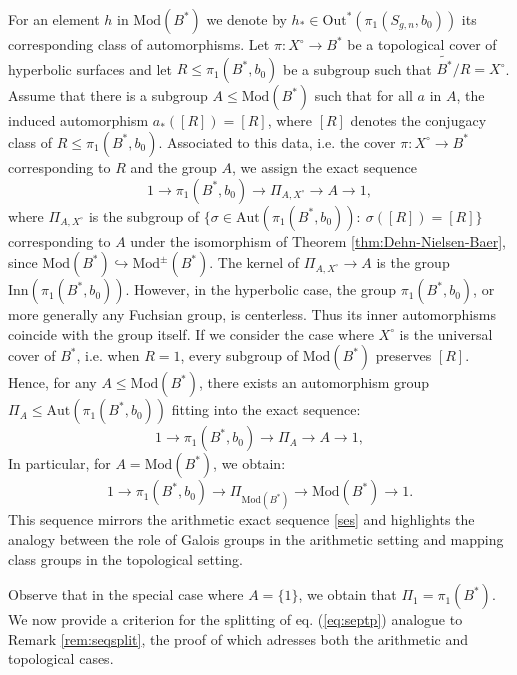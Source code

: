 \documentclass[10pt]{amsart}
\theoremstyle{definition}
\newcommand{\A}{{ \mathrm{Aut} }}
\begin{document}
For an element $h$ in $\mathrm{Mod}(B^*)$ we denote by $h_* \in \mathrm{Out}^*(\pi_1(S_{g,n},b_0)) $ its corresponding class of automorphisms. Let $\pi \colon X^\circ \rightarrow B^*$ be a topological cover of hyperbolic surfaces and let $R\leq \pi_1(B^*,b_0)$ be a subgroup such that $\widetilde{B^*}/R = X^\circ$. 
Assume that there is a subgroup $A \leq \mathrm{Mod}(B^*)$ such that for all $a$ in $A$, the induced automorphism $a_*([R]) = [R]$, where $[R]$ denotes the conjugacy class of $R \leq \pi_1(B^*,b_0)$. Associated to this data, i.e. the cover $\pi\colon X^\circ \rightarrow B^*$ corresponding to $R$ and the group $A$, we assign the exact sequence
\begin{equation}
    1\rightarrow \pi_1(B^*,b_0) \rightarrow \Pi_{A,X^\circ} \rightarrow A \rightarrow 1,
\end{equation}
where $\Pi_{A,X^\circ}$ is the subgroup of $\{ \sigma \in \A(\pi_1(B^*,b_0))\colon \ \sigma([R]) = [R] \}$ corresponding to $A$ under the isomorphism of Theorem \ref{thm:Dehn-Nielsen-Baer}, since $\mathrm{Mod}(B^*) \hookrightarrow \mathrm{Mod}^{\pm}(B^*)$. The kernel of $\Pi_{A,X^\circ} \to A$ is the group 
$\mathrm{Inn}(\pi_1(B^*,b_0))$. However, in the hyperbolic case, the group $\pi_1(B^*, b_0)$, or
more generally any Fuchsian group, is centerless. Thus its inner automorphisms coincide with the group itself. 
If we consider the case where $X^{\circ}$ is the universal cover of $B^*$, i.e. when $R=1$, every subgroup of $\mathrm{Mod}(B^*)$ preserves $[R]$. Hence, for any $A \leq \mathrm{Mod}(B^*)$, there exists an automorphism group $\Pi_A \leq \A(\pi_1(B^*,b_0))$ fitting into the exact sequence:
\begin{equation}\label{eq:septp} 
    1\rightarrow \pi_1(B^*,b_0) \rightarrow \Pi_{A} \rightarrow A \rightarrow 1,
\end{equation} 
In particular, for $A = \mathrm{Mod}(B^*)$, we obtain:
\begin{equation}\label{ses:Pi_Mod}
    1\rightarrow \pi_1(B^*,b_0) \rightarrow \Pi_{\mathrm{Mod}(B^*)} \rightarrow \mathrm{Mod}(B^*)\rightarrow 1.
\end{equation}
This sequence mirrors the arithmetic exact sequence \eqref{ses} and highlights the analogy between the role of Galois groups in the arithmetic setting and mapping class groups in the topological setting.

Observe that in the special case where $A=\{1\}$, we obtain that $\Pi_1=\pi_1(B^*)$. 
We now provide a criterion for the splitting of eq. (\ref{eq:septp}) analogue to Remark \ref{rem:seqsplit}, the proof of which adresses both the arithmetic and topological cases.
\end{document}
